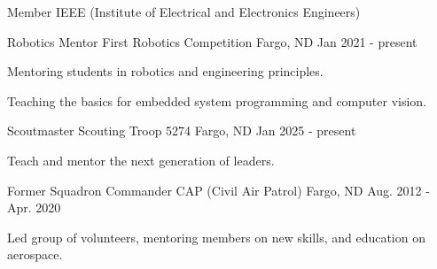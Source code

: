 

\begin{cventries}

  \cventry
    {Member} %
    {IEEE (Institute of Electrical and Electronics Engineers)} %
    {} %
    {} %
    {
      \begin{cvitems} %
      \end{cvitems}
    }

  \cventry
    {Robotics Mentor} %
    {First Robotics Competition} %
    {Fargo, ND} %
    {Jan 2021 - present} %
    {
      \begin{cvitems} %
        \item {Mentoring students in robotics and engineering principles.}
        \item {Teaching the basics for embedded system programming and computer vision.}
      \end{cvitems}
    }

  \cventry
    {Scoutmaster} %
    {Scouting Troop 5274} %
    {Fargo, ND} %
    {Jan 2025 - present} %
    {
      \begin{cvitems} %
        \item {Teach and mentor the next generation of leaders.}
      \end{cvitems}
    }

  \cventry
    {Former Squadron Commander} %
    {CAP (Civil Air Patrol)} %
    {Fargo, ND} %
    {Aug. 2012 - Apr. 2020} %
    {
      \begin{cvitems} %
        \item {Led group of volunteers, mentoring members on new skills, and education on aerospace.}
      \end{cvitems}
    }


\end{cventries}
